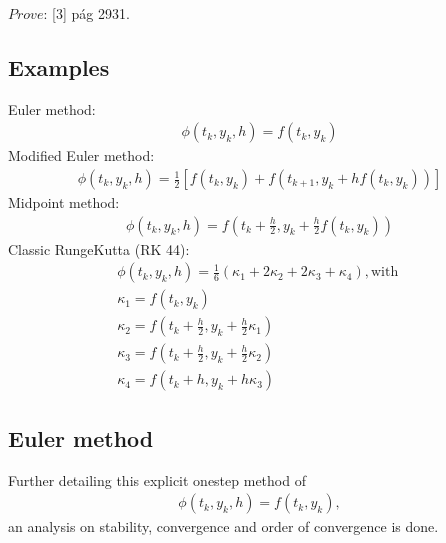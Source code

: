 \documentclass[letterpaper,10pt,english]{jupyterBook}
\begin{document}
\sphinxAtStartPar
\(\textit{Prove:}\) {[}3{]} pág 29\sphinxhyphen{}31.


\subsection{Examples}
\label{\detokenize{cap2:examples}}
\sphinxAtStartPar
Euler method:
\begin{equation*}
\begin{split}
    \phi (t_{k},y_{k},h) = f(t_{k},y_{k})
\end{split}
\end{equation*}
\sphinxAtStartPar
Modified Euler method:
\begin{equation*}
\begin{split}
    \phi (t_{k},y_{k},h) = \frac{1}{2} \left[ f(t_{k},y_{k}) + f(t_{k+1},y_{k} + h f(t_{k},y_{k})) \right]
\end{split}
\end{equation*}
\sphinxAtStartPar
Midpoint method:
\begin{equation*}
\begin{split}
    \phi (t_{k},y_{k},h) = f(t_{k} + \frac{h}{2},y_{k} + \frac{h}{2} f(t_{k},y_{k}))
\end{split}
\end{equation*}
\sphinxAtStartPar
Classic Runge\sphinxhyphen{}Kutta (RK 4\sphinxhyphen{}4):
\begin{equation*}
\begin{split}
    \phi (t_{k},y_{k},h) = \frac{1}{6} \left( \kappa_1 + 2 \kappa_2 + 2 \kappa_3 + \kappa_4 \right), \text{with }\\
    \kappa_1 = f(t_{k},y_{k})\\
    \kappa_2 = f(t_{k} + \frac{h}{2},y_{k} + \frac{h}{2} \kappa_1)\\
    \kappa_3 = f(t_{k} + \frac{h}{2},y_{k} + \frac{h}{2} \kappa_2)\\
    \kappa_4 = f(t_{k} + h, y_{k} + h \kappa_3)
\end{split}
\end{equation*}

\subsection{Euler method}
\label{\detokenize{cap2:euler-method}}
\sphinxAtStartPar
Further detailing this explicit one\sphinxhyphen{}step method of
\begin{equation*}
\begin{split}
    \phi (t_{k},y_{k},h) = f(t_{k},y_{k}),
\end{split}
\end{equation*}
\sphinxAtStartPar
an analysis on stability, convergence and order of convergence is done.
\end{document}
